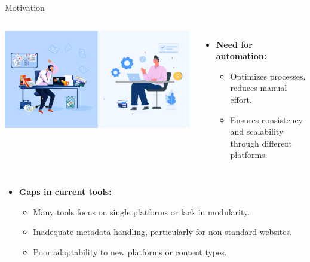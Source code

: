 \documentclass{beamer}
\begin{document}
    \begin{frame}{Motivation}
        \begin{columns}[T]
            \hspace{-0.5cm}
            \vspace{0.2cm}
            \begin{center}
                \includegraphics[width=1.63\textwidth, keepaspectratio]{images/introduction_and_motivation_motivation_slide_image.png}
            \end{center}

            \vspace{0.5cm}
            \begin{itemize}
                \item \textbf{Need for automation:}
                \begin{itemize}
                    \item Optimizes processes, reduces manual effort.
                    \item Ensures consistency and scalability through different platforms.
                \end{itemize}
            \end{itemize}
        \end{columns}

        \vspace{0.5cm}
        \begin{itemize}
            \item \textbf{Gaps in current tools:}
            \begin{itemize}
                \item Many tools focus on single platforms or lack in modularity.
                \item Inadequate metadata handling, particularly for non-standard websites.
                \item Poor adaptability to new platforms or content types.
            \end{itemize}
        \end{itemize}
    \end{frame}
\end{document}
